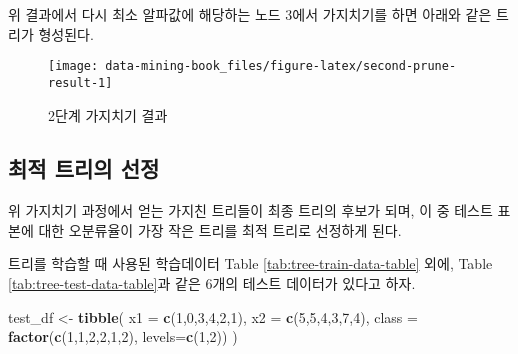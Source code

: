 \documentclass[]{book}
\newenvironment{Shaded}{\begin{snugshade}}{\end{snugshade}}
\newcommand{\DataTypeTok}[1]{\textcolor[rgb]{0.13,0.29,0.53}{#1}}
\newcommand{\DecValTok}[1]{\textcolor[rgb]{0.00,0.00,0.81}{#1}}
\newcommand{\FloatTok}[1]{\textcolor[rgb]{0.00,0.00,0.81}{#1}}
\newcommand{\KeywordTok}[1]{\textcolor[rgb]{0.13,0.29,0.53}{\textbf{#1}}}
\newcommand{\NormalTok}[1]{#1}
\newcommand{\OperatorTok}[1]{\textcolor[rgb]{0.81,0.36,0.00}{\textbf{#1}}}
\newcommand{\StringTok}[1]{\textcolor[rgb]{0.31,0.60,0.02}{#1}}
\begin{document}
위 결과에서 다시 최소 알파값에 해당하는 노드 3에서 가지치기를 하면 아래와 같은 트리가 형성된다.

\begin{Shaded}
\end{Shaded}

\begin{figure}

{\centering \texttt{[image: data-mining-book\_files/figure-latex/second-prune-result-1]} 

}

\caption{2단계 가지치기 결과}\label{fig:second-prune-result}
\end{figure}

\hypertarget{cart-best-tree}{%
\subsection{최적 트리의 선정}\label{cart-best-tree}}

위 가지치기 과정에서 얻는 가지친 트리들이 최종 트리의 후보가 되며, 이 중 테스트 표본에 대한 오분류율이 가장 작은 트리를 최적 트리로 선정하게 된다.

트리를 학습할 때 사용된 학습데이터 Table \ref{tab:tree-train-data-table} 외에, Table \ref{tab:tree-test-data-table}과 같은 6개의 테스트 데이터가 있다고 하자.

\begin{Shaded}
\begin{Highlighting}[]
\NormalTok{test_df <-}\StringTok{ }\KeywordTok{tibble}\NormalTok{(}
  \DataTypeTok{x1 =} \KeywordTok{c}\NormalTok{(}\DecValTok{1}\NormalTok{,}\DecValTok{0}\NormalTok{,}\DecValTok{3}\NormalTok{,}\DecValTok{4}\NormalTok{,}\DecValTok{2}\NormalTok{,}\DecValTok{1}\NormalTok{),}
  \DataTypeTok{x2 =} \KeywordTok{c}\NormalTok{(}\DecValTok{5}\NormalTok{,}\DecValTok{5}\NormalTok{,}\DecValTok{4}\NormalTok{,}\DecValTok{3}\NormalTok{,}\DecValTok{7}\NormalTok{,}\DecValTok{4}\NormalTok{),}
  \DataTypeTok{class =} \KeywordTok{factor}\NormalTok{(}\KeywordTok{c}\NormalTok{(}\DecValTok{1}\NormalTok{,}\DecValTok{1}\NormalTok{,}\DecValTok{2}\NormalTok{,}\DecValTok{2}\NormalTok{,}\DecValTok{1}\NormalTok{,}\DecValTok{2}\NormalTok{), }\DataTypeTok{levels=}\KeywordTok{c}\NormalTok{(}\DecValTok{1}\NormalTok{,}\DecValTok{2}\NormalTok{))}
\NormalTok{)}
\end{Highlighting}
\end{Shaded}
\end{document}
